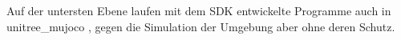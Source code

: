 
Auf der untersten Ebene laufen mit dem SDK entwickelte Programme auch in unitree\_mujoco \cite{UnitreeMujoco}, gegen die Simulation der Umgebung aber ohne deren Schutz.


